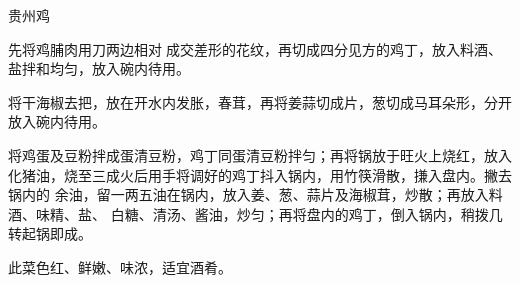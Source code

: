 %
%
%
%
%
%
%
\begin{recipe}{贵州鸡}

\ingredients


\preparation

\step 先将鸡脯肉用刀两边相对𠟤成交差形的花纹，再切成四分见方的鸡丁，放入料酒、
盐拌和均匀，放入碗内待用。

\step 将干海椒去把，放在开水内发胀，春茸，再将姜蒜切成片，葱切成马耳朵形，分开
放入碗内待用。

\step 将鸡蛋及豆粉拌成蛋清豆粉，鸡丁同蛋清豆粉拌匀；再将锅放于旺火上烧红，放入
化猪油，烧至三成火后用手将调好的鸡丁抖入锅内，用竹筷滑散，搛入盘内。撇去锅内的
余油，留一两五油在锅内，放入姜、葱、蒜片及海椒茸，炒散；再放入料酒、味精、盐、
白糖、清汤、酱油，炒匀；再将盘内的鸡丁，倒入锅内，稍拨几转起锅即成。

\features

此菜色红、鲜嫩、味浓，适宜酒肴。

\end{recipe}

